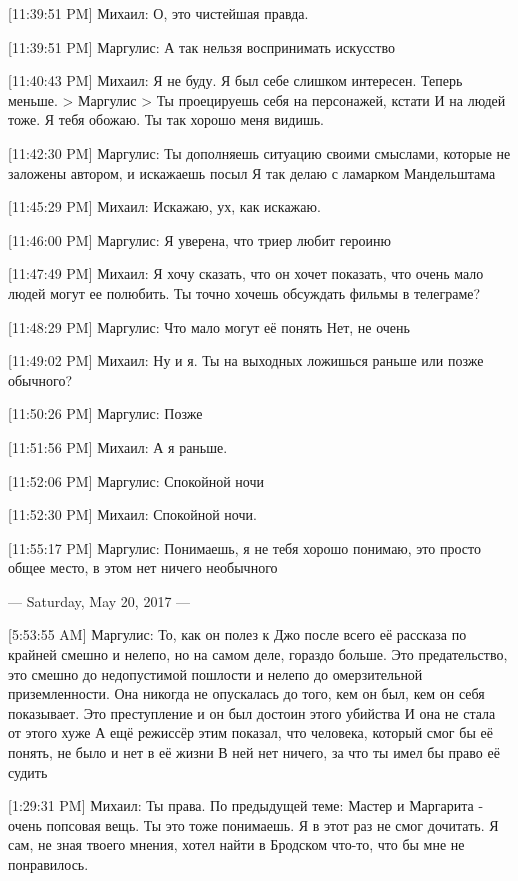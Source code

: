 \documentclass{article}
\begin{document}
{[11:39:51 PM] Михаил:
О, это чистейшая правда.

[11:39:51 PM] Маргулис:
А так нельзя воспринимать искусство

[11:40:43 PM] Михаил:
Я не буду. Я был себе слишком интересен. Теперь меньше.
> Маргулис
> Ты проецируешь себя на персонажей, кстати
И на людей тоже.
 Я тебя обожаю. Ты так хорошо меня видишь.

[11:42:30 PM] Маргулис:
Ты дополняешь ситуацию своими смыслами, которые не заложены автором, и искажаешь посыл
 Я так делаю с ламарком
 Мандельштама

[11:45:29 PM] Михаил:
Искажаю, ух, как искажаю.

[11:46:00 PM] Маргулис:
Я уверена, что триер любит героиню

[11:47:49 PM] Михаил:
Я хочу сказать, что он хочет показать, что очень мало людей могут ее полюбить.
 Ты точно хочешь обсуждать фильмы в телеграме?

[11:48:29 PM] Маргулис:
Что мало могут её понять
 Нет, не очень

[11:49:02 PM] Михаил:
Ну и я.
 Ты на выходных ложишься раньше или позже обычного?

[11:50:26 PM] Маргулис:
Позже

[11:51:56 PM] Михаил:
А я раньше.

[11:52:06 PM] Маргулис:
Спокойной ночи

[11:52:30 PM] Михаил:
Спокойной ночи.

[11:55:17 PM] Маргулис:
Понимаешь, я не тебя хорошо понимаю, это просто общее место, в этом нет ничего необычного

--- Saturday, May 20, 2017 ---

[5:53:55 AM] Маргулис:
То, как он полез к Джо после всего её рассказа по крайней смешно и нелепо, но на самом деле, гораздо больше. Это предательство, это смешно до недопустимой пошлости и нелепо до омерзительной приземленности. Она никогда не опускалась до того, кем он был, кем он себя показывает. Это преступление и он был достоин этого убийства
 И она не стала от этого хуже
 А ещё режиссёр этим показал, что человека, который смог бы её понять, не было и нет в её жизни
 В ней нет ничего, за что ты  имел бы право её судить

[1:29:31 PM] Михаил:
Ты права.
 По предыдущей теме: Мастер и Маргарита - очень попсовая вещь. Ты это тоже понимаешь. 
Я в этот раз не смог дочитать.
 Я сам, не зная твоего мнения, хотел найти в Бродском что-то, что бы мне не понравилось.

}
\end{document}

